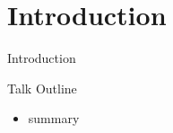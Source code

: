 \section*{Introduction}

\begin{frame}{Introduction}
\end{frame}

\begin{frame}{Talk Outline}
    \begin{itemize}
        \item summary
    \end{itemize}
\end{frame}